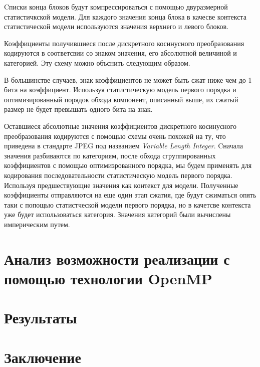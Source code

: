\documentclass{matmex-diploma-custom}
\begin{document}
Cписки конца блоков будут компрессироваться с помощью двуразмерной статистичкской модели. Для каждого значения конца блока в качесве контекста статистической модели используются значения верхнего и левого блоков.

Коэффициенты получившиеся после дискретного косинусного преобразования кодируются в соответсвии со знаком значения, его абсолютной величиной и категорией. Эту схему можно объснить следующим образом.

В большинстве случаев, знак коэффициентов не может быть сжат ниже чем до 1 бита на коэффициент. Используя статистическую модель первого порядка и оптимизированный порядок обхода компонент, описанный выше, их сжатый размер не будет превышать одного бита на знак.

Оставшиеся абсолютные значения коэффициентов дискретного косинусного преобразования кодируются с помощью схемы очень похожей на ту, что  приведена в стандарте JPEG под  названием \emph{Variable Length Integer}. Cначала значения разбиваются по категориям, после обхода сгруппированных коэффициентов с помощью оптимизрованного порядка, мы будем применять для кодирования последовательности статистическую модель первого порядка. Используя предшествующие значения как контекст для модели. Полученные коэффициенты отправляются на еще один этап сжатия, где будут сжиматься опять таки с попощью статистческой модели первого порядка, но в качетсве контекста уже будет использоваться категория. Значения категорий были вычислены империческим путем.

\section{Анализ возможности реализации с помощью технологии OpenMP}



\section{Результаты}
\section*{Заключение}



\end{document}

